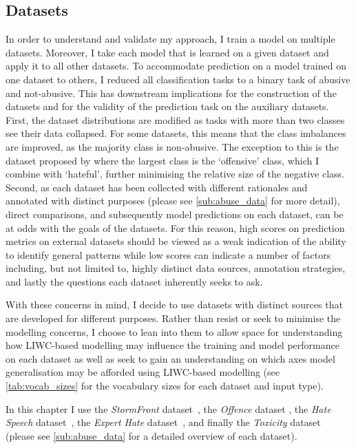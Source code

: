 \subsection{Datasets}\label{sub:liwc_datasets}
In order to understand and validate my approach, I train a model on multiple datasets. Moreover, I take each model that is learned on a given dataset and apply it to all other datasets. To accommodate prediction on a model trained on one dataset to others, I reduced all classification tasks to a binary task of abusive and not-abusive. This has downstream implications for the construction of the datasets and for the validity of the prediction task on the auxiliary datasets.
First, the dataset distributions are modified as tasks with more than two classes see their data collapsed. For some datasets, this means that the class imbalances are improved, as the majority class is non-abusive. The exception to this is the dataset proposed by \citet{Davidson:2017} where the largest class is the `offensive' class, which I combine with `hateful', further minimising the relative size of the negative class.
Second, as each dataset has been collected with different rationales and annotated with distinct purposes (please see \cref{sub:abuse_data} for more detail), direct comparisons, and subsequently model predictions on each dataset, can be at odds with the goals of the datasets. For this reason, high scores on prediction metrics on external datasets should be viewed as a weak indication of the ability to identify general patterns while low scores can indicate a number of factors including, but not limited to, highly distinct data sources, annotation strategies, and lastly the questions each dataset inherently seeks to ask.

With these concerns in mind, I decide to use datasets with distinct sources that are developed for different purposes. Rather than resist or seek to minimise the modelling concerns, I choose to lean into them to allow space for understanding how LIWC-based modelling may influence the training and model performance on each dataset as well as seek to gain an understanding on which axes model generalisation may be afforded using LIWC-based modelling (see \cref{tab:vocab_sizes} for the vocabulary sizes for each dataset and input type).

In this chapter I use the \textit{StormFront} dataset~\citep{Garcia:2019}, the \textit{Offence} dataset \citep{Davidson:2017}, the \textit{Hate Speech} dataset~\citep{Waseem-Hovy:2016}, the \textit{Expert Hate} dataset~\citep{Waseem:2016}, and finally the \textit{Toxicity} dataset~\citep{Wulczyn:2017} (please see \cref{sub:abuse_data} for a detailed overview of each dataset).

